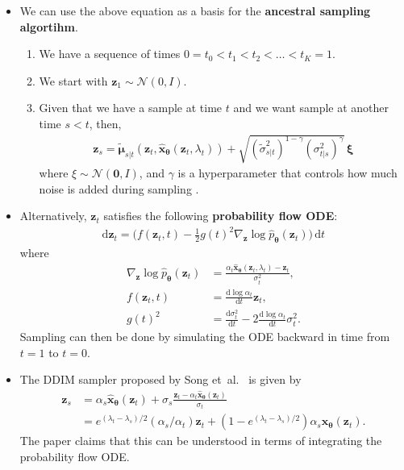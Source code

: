\documentclass[10pt]{article}
\newcommand{\dee}{\mathrm{d}}
\newcommand{\ve}[1]{\mathbf{#1}}
\newcommand{\ves}[1]{\boldsymbol{#1}}
\newcommand{\etal}{{et~al.}}
\newcommand{\mcal}[1]{\mathcal{#1}}
\begin{document}
\begin{itemize}
  \item We can use the above equation as a basis for the {\bf ancestral sampling algortihm}.
  \begin{enumerate}
    \item We have a sequence of times $0 = t_0 < t_1 < t_2 < \dotsc < t_K = 1$.    
    \item We start with $\ve{z}_1 \sim \mcal{N}(0,I)$.
    \item Given that we have a sample at time $t$ and we want sample at another time $s < t$, then,
    \begin{align*}
      \ve{z}_s = \tilde{\ves{\mu}}_{s|t}(\ve{z}_t, \hat{\ve{x}}_{\ves{\theta}}(\ve{z}_t, \lambda_t)) + \sqrt{(\tilde{\sigma}_{s|t}^2)^{1-\gamma}(\sigma_{t|s}^2)^\gamma} \, \ves{\xi}
    \end{align*}
    where $\xi \sim \mcal{N}(\ve{0},I)$, and $\gamma$ is a hyperparameter that controls how much noise is added during sampling \cite{Nichol:2021}.
  \end{enumerate}

  \item Alternatively, $\ve{z}_t$ satisfies the following {\bf probability flow ODE}:
  \begin{align*}
    \dee\ve{z}_t = \bigg( f(\ve{z}_t, t) - \frac{1}{2}g(t)^2 \nabla_{\ve{z}}\log \hat{p}_{\ves{\theta}}(\ve{z}_t) \bigg)\, \dee t
  \end{align*}
  where
  \begin{align*}
    \nabla_{\ve{z}}\log \hat{p}_{\ves{\theta}}(\ve{z}_t) &= \frac{\alpha_t \hat{\ve{x}}_{\ves{\theta}}(\ve{z}_t, \lambda_t) - \ve{z}_t}{\sigma_t^2}, \\
    f(\ve{z}_t, t) &= \frac{\dee \log \alpha_t}{\dee t} \ve{z}_t, \\
    g(t)^2 &= \frac{\dee \sigma_t^2}{\dee t} - 2 \frac{\dee \log \alpha_t}{\dee t} \sigma_t^2.
  \end{align*}
  Sampling can then be done by simulating the ODE backward in time from $t = 1$ to $t = 0$.

  \item The DDIM sampler proposed by Song \etal~\cite{Song:DDIM:2020} is given by
  \begin{align*}
    \ve{z}_s 
    &= \alpha_s \hat{\ve{x}}_{\ves{\theta}}(\ve{z}_t) + \sigma_s \frac{\ve{z}_t - \alpha_t \hat{\ve{x}}_{\ves{\theta}}(\ve{z}_t)}{\sigma_t} \\
    &= e^{(\lambda_t - \lambda_s)/2}(\alpha_s / \alpha_t) \ve{z}_t + (1 - e^{(\lambda_t - \lambda_s)/2}) \alpha_s \hat{\ve{x}}_{\ves{\theta}}(\ve{z}_t).
  \end{align*}
  The paper claims that this can be understood in terms of integrating the probability flow ODE.
\end{itemize}
\end{document}
